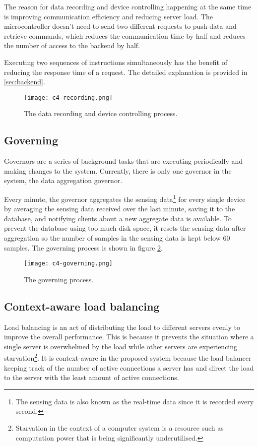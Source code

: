 \documentclass[../thesis.tex]{subfiles}
\begin{document}
The reason for data recording and device controlling happening at the same time is improving communication efficiency and reducing server load. The microcontroller doesn't need to send two different requests to push data and retrieve commands, which reduces the communication time by half and reduces the number of access to the backend by half.

Executing two sequences of instructions simultaneously has the benefit of reducing the response time of a request. The detailed explanation is provided in \autoref{sec:backend}.

\begin{figure}[!ht]
\centering
\texttt{[image: c4-recording.png]}
\caption{The data recording and device controlling process.}
\label{fig:record}
\end{figure}

\subsection{Governing}
\label{sec:governor}

Governors are a series of background tasks that are executing periodically and making changes to the system. Currently, there is only one governor in the system, the data aggregation governor.

Every minute, the governor aggregates the sensing data\footnote{The sensing data is also known as the real-time data since it is recorded every second.} for every single device by averaging the sensing data received over the last minute, saving it to the database, and notifying clients about a new aggregate data is available. To prevent the database using too much disk space, it resets the sensing data after aggregation so the number of samples in the sensing data is kept below 60 samples. The governing process is shown in figure \ref{fig:governing}.

\begin{figure}[!ht]
\centering
\texttt{[image: c4-governing.png]}
\caption{The governing process.}
\label{fig:governing}
\end{figure}

\subsection{Context-aware load balancing}

Load balancing is an act of distributing the load to different servers evenly to improve the overall performance. This is because it prevents the situation where a single server is overwhelmed by the load while other servers are experiencing starvation\footnote{Starvation in the context of a computer system is a resource such as computation power that is being significantly underutilised.}. It is context-aware in the proposed system because the load balancer keeping track of the number of active connections a server has and direct the load to the server with the least amount of active connections.
\end{document}
